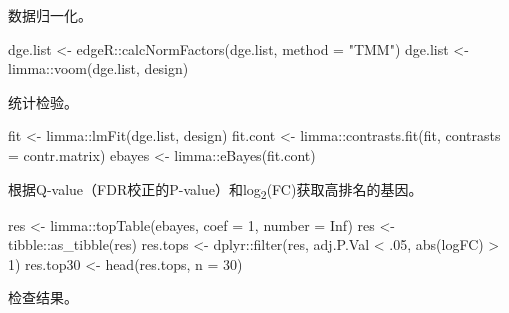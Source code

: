 \documentclass[
]{article}
\newenvironment{Shaded}{\begin{snugshade}}{\end{snugshade}}
\newcommand{\AttributeTok}[1]{\textcolor[rgb]{0.77,0.63,0.00}{#1}}
\newcommand{\ConstantTok}[1]{\textcolor[rgb]{0.00,0.00,0.00}{#1}}
\newcommand{\DecValTok}[1]{\textcolor[rgb]{0.00,0.00,0.81}{#1}}
\newcommand{\FunctionTok}[1]{\textcolor[rgb]{0.00,0.00,0.00}{#1}}
\newcommand{\NormalTok}[1]{#1}
\newcommand{\OtherTok}[1]{\textcolor[rgb]{0.56,0.35,0.01}{#1}}
\newcommand{\SpecialCharTok}[1]{\textcolor[rgb]{0.00,0.00,0.00}{#1}}
\newcommand{\StringTok}[1]{\textcolor[rgb]{0.31,0.60,0.02}{#1}}
\begin{document}
数据归一化。

\begin{Shaded}
\begin{Highlighting}[]
\NormalTok{dge.list }\OtherTok{\textless{}{-}}\NormalTok{ edgeR}\SpecialCharTok{::}\FunctionTok{calcNormFactors}\NormalTok{(dge.list, }\AttributeTok{method =} \StringTok{"TMM"}\NormalTok{)}
\NormalTok{dge.list }\OtherTok{\textless{}{-}}\NormalTok{ limma}\SpecialCharTok{::}\FunctionTok{voom}\NormalTok{(dge.list, design)}
\end{Highlighting}
\end{Shaded}

统计检验。

\begin{Shaded}
\begin{Highlighting}[]
\NormalTok{fit }\OtherTok{\textless{}{-}}\NormalTok{ limma}\SpecialCharTok{::}\FunctionTok{lmFit}\NormalTok{(dge.list, design)}
\NormalTok{fit.cont }\OtherTok{\textless{}{-}}\NormalTok{ limma}\SpecialCharTok{::}\FunctionTok{contrasts.fit}\NormalTok{(fit, }\AttributeTok{contrasts =}\NormalTok{ contr.matrix)}
\NormalTok{ebayes }\OtherTok{\textless{}{-}}\NormalTok{ limma}\SpecialCharTok{::}\FunctionTok{eBayes}\NormalTok{(fit.cont)}
\end{Highlighting}
\end{Shaded}

根据Q-value（FDR校正的P-value）和log\textsubscript{2}(FC)获取高排名的基因。

\begin{Shaded}
\begin{Highlighting}[]
\NormalTok{res }\OtherTok{\textless{}{-}}\NormalTok{ limma}\SpecialCharTok{::}\FunctionTok{topTable}\NormalTok{(ebayes, }\AttributeTok{coef =} \DecValTok{1}\NormalTok{, }\AttributeTok{number =} \ConstantTok{Inf}\NormalTok{)}
\NormalTok{res }\OtherTok{\textless{}{-}}\NormalTok{ tibble}\SpecialCharTok{::}\FunctionTok{as\_tibble}\NormalTok{(res)}
\NormalTok{res.tops }\OtherTok{\textless{}{-}}\NormalTok{ dplyr}\SpecialCharTok{::}\FunctionTok{filter}\NormalTok{(res, adj.P.Val }\SpecialCharTok{\textless{}}\NormalTok{ .}\DecValTok{05}\NormalTok{, }\FunctionTok{abs}\NormalTok{(logFC) }\SpecialCharTok{\textgreater{}} \DecValTok{1}\NormalTok{)}
\NormalTok{res.top30 }\OtherTok{\textless{}{-}} \FunctionTok{head}\NormalTok{(res.tops, }\AttributeTok{n =} \DecValTok{30}\NormalTok{)}
\end{Highlighting}
\end{Shaded}

检查结果。
\end{document}
